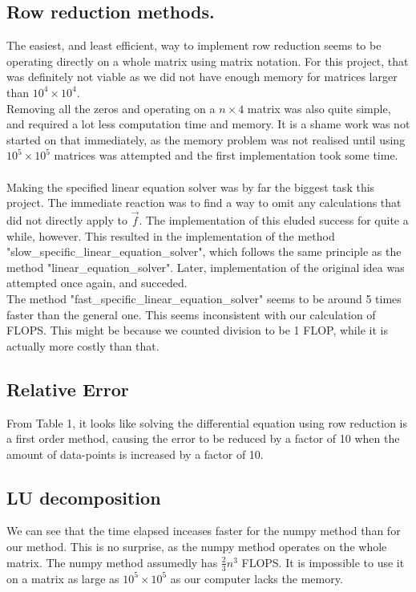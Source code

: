 \documentclass[a4paper,12pt,norsk]{article}
\begin{document}
	\subsection{Row reduction methods.}
	The easiest, and least efficient, way to implement row reduction seems to be operating directly on a whole matrix using matrix notation. For this project, that was definitely not viable as we did not have enough memory for matrices larger than $10^4 \times 10^4$.\\
	Removing all the zeros and operating on a $n \times 4$ matrix was also quite simple, and required a lot less computation time and memory. It is a shame work was not started on that immediately, as the memory problem was not realised until using $10^5 \times 10^5$ matrices was attempted and the first implementation took some time.\\
	\\
	Making the specified linear equation solver was by far the biggest task this project. The immediate reaction was to find a way to omit any calculations that did not directly apply to $\vec{f}$. The implementation of this eluded success for quite a while, however. This resulted in the implementation of the method "slow\_specific\_linear\_equation\_solver", which follows the same principle as the method "linear\_equation\_solver". Later, implementation of the original idea was attempted once again, and succeded.\\
	The method "fast\_specific\_linear\_equation\_solver" seems to be around 5 times faster than the general one. This seems inconsistent with our calculation of FLOPS. This might be because we counted division to be 1 FLOP, while it is actually more costly than that.

	\subsection{Relative Error}
	From Table 1, it looks like solving the differential equation using row reduction is a first order method, causing the error to be reduced by a factor of 10 when the amount of data-points is increased by a factor of 10.

	\subsection{LU decomposition}
	We can see that the time elapsed inceases faster for the numpy method than for our method. This is no surprise, as the numpy method operates on the whole matrix. The numpy method assumedly has $\frac{2}{3}n^3$ FLOPS. It is impossible to use it on a matrix as large as $10^5 \times 10^5$ as our computer lacks the memory.
\end{document}
